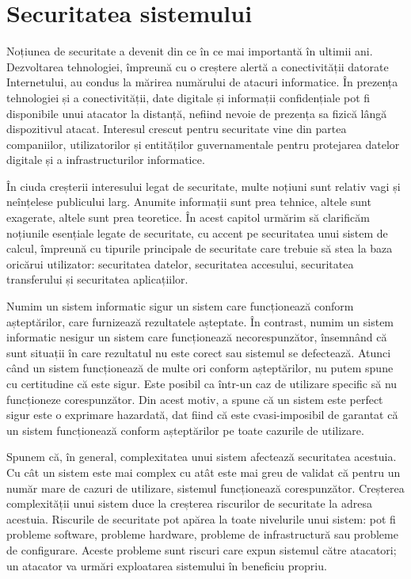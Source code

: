 \chapter{Securitatea sistemului}
\label{chapter:sec}

Noțiunea de securitate a devenit din ce în ce mai importantă în ultimii ani. Dezvoltarea tehnologiei, împreună cu o creștere alertă a conectivității datorate Internetului, au condus la mărirea numărului de atacuri informatice. În prezența tehnologiei și a conectivității, date digitale și informații confidențiale pot fi disponibile unui atacator la distanță, nefiind nevoie de prezența sa fizică lângă dispozitivul atacat. Interesul crescut pentru securitate vine din partea companiilor, utilizatorilor și entităților guvernamentale pentru protejarea datelor digitale și a infrastructurilor informatice.

În ciuda creșterii interesului legat de securitate, multe noțiuni sunt relativ vagi și neînțelese publicului larg. Anumite informații sunt prea tehnice, altele sunt exagerate, altele sunt prea teoretice. În acest capitol urmărim să clarificăm noțiunile esențiale legate de securitate, cu accent pe securitatea unui sistem de calcul, împreună cu tipurile principale de securitate care trebuie să stea la baza oricărui utilizator: securitatea datelor, securitatea accesului, securitatea transferului și securitatea aplicațiilor.

Numim un sistem informatic sigur un sistem care funcționează conform așteptărilor, care furnizează rezultatele așteptate. În contrast, numim un sistem informatic nesigur un sistem care funcționează necorespunzător, însemnând că sunt situații în care rezultatul nu este corect sau sistemul se defectează. Atunci când un sistem funcționează de multe ori conform așteptărilor, nu putem spune cu certitudine că este sigur. Este posibil ca într-un caz de utilizare specific să nu funcționeze corespunzător. Din acest motiv, a spune că un sistem este perfect sigur este o exprimare hazardată, dat fiind că este cvasi-imposibil de garantat că un sistem funcționează conform așteptărilor pe toate cazurile de utilizare.

Spunem că, în general, complexitatea unui sistem afectează securitatea acestuia. Cu cât un sistem este mai complex cu atât este mai greu de validat că pentru un număr mare de cazuri de utilizare, sistemul funcționează corespunzător. Creșterea complexității unui sistem duce la creșterea riscurilor de securitate la adresa acestuia. Riscurile de securitate pot apărea la toate nivelurile unui sistem: pot fi probleme software, probleme hardware, probleme de infrastructură sau probleme de configurare. Aceste probleme sunt riscuri care expun sistemul către atacatori; un atacator va urmări exploatarea sistemului în beneficiu propriu.

